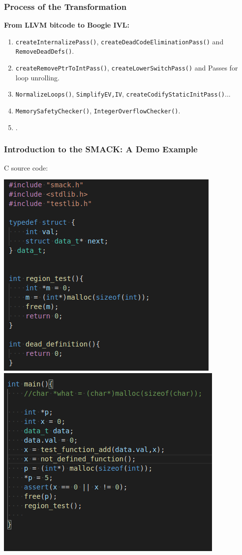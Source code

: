 \documentclass[11pt]{beamer}
\begin{document}
\begin{frame}\frametitle{Process of the Transformation}
\textbf{From LLVM bitcode to Boogie IVL:}
\begin{enumerate}
\item  \texttt{createInternalizePass()},  \texttt{createDeadCodeEliminationPass()} and \texttt{RemoveDeadDefs()}.
\item \texttt{createRemovePtrToIntPass()}, \texttt{createLowerSwitchPass()} and Passes for loop unrolling.
\item \texttt{NormalizeLoops()}, \texttt{SimplifyEV,IV}, \texttt{createCodifyStaticInitPass()}...
\item \texttt{MemorySafetyChecker()}, \texttt{IntegerOverflowChecker()}.
\item {}.
\end{enumerate}


\end{frame}

\begin{frame}\frametitle{Introduction to the SMACK: A Demo Example}
C source code:
\begin{center}
\includegraphics[scale=0.35]{example_code1.png}
\includegraphics[scale=0.35]{example_code2.png}
\end{center}

\end{frame}
\end{document}
